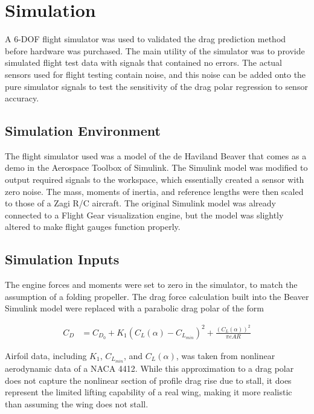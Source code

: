 \section{Simulation}
\label{simulation}
A 6-DOF flight simulator was used to validated the drag prediction method before hardware was purchased. The main utility of the simulator was to provide simulated flight test data with signals that contained no errors. The actual sensors used for flight testing contain noise, and this noise can be added onto the pure simulator signals to test the sensitivity of the drag polar regression to sensor accuracy.

\subsection*{Simulation Environment}
The flight simulator used was a model of the de Haviland Beaver that comes as a demo in the Aerospace Toolbox of Simulink. The Simulink model was modified to output required signals to the workspace, which essentially created a sensor with zero noise. The mass, moments of inertia, and reference lengths were then scaled to those of a Zagi R/C aircraft\cite{stevens2003aircraft}. The original Simulink model was already connected to a Flight Gear visualization engine, but the model was slightly altered to make flight gauges function properly.

\subsection*{Simulation Inputs}
The engine forces and moments were set to zero in the simulator, to match the assumption of a folding propeller.
The drag force calculation built into the Beaver Simulink model were replaced with a parabolic drag polar of the form

\begin{align}
C_D &= C_{D_0} + K_1(C_L(\alpha)-C_{L_{min}})^2+\frac{(C_L(\alpha))^2}{\pi eAR}
\end{align}

Airfoil data, including $K_1$, $C_{L_{min}}$, and $C_L(\alpha)$, was taken from nonlinear aerodynamic data of a NACA 4412. While this approximation to a drag polar does not capture the nonlinear section of profile drag rise due to stall, it does represent the limited lifting capability of a real wing, making it more realistic than assuming the wing does not stall.
